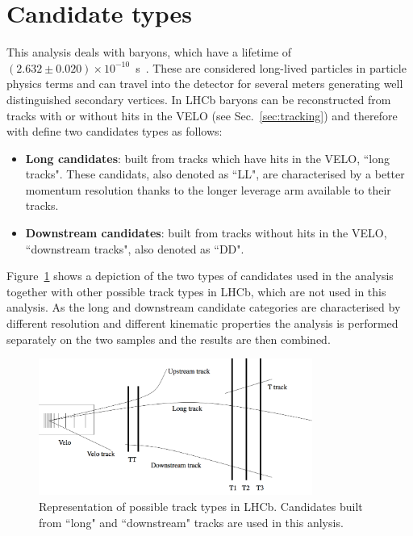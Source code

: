 \section{Candidate types}

This analysis deals with \Lz baryons, which have a lifetime of \mbox{$(2.632 \pm 0.020 ) \times 10^{-10}$ s~\cite{PDG2014}}.
These are considered long-lived particles in particle physics terms and can travel into the
detector for several meters generating well distinguished secondary vertices.
In LHCb \Lz baryons can be reconstructed from tracks with or without hits in the VELO (see Sec.~\ref{sec:tracking}) and
therefore with define two candidates types as follows:

\begin{itemize}
\item {\bf Long candidates}: built from tracks which have hits in the VELO, ``long tracks".
These candidats, also denoted as ``LL", are characterised by a better momentum resolution
thanks to the longer leverage arm available to their tracks.
\item {\bf Downstream candidates}: built from tracks without hits in the VELO, 
``downstream tracks", also denoted as ``DD".
\end{itemize}

Figure~\ref{fig:track_types} shows a depiction of the two types of candidates used in the analysis
together with other possible track types in LHCb, which are not used in this analysis.
As the long and downstream candidate categories are characterised by different resolution and different
kinematic properties the analysis is performed separately on the two samples and the results are then combined.

\begin{figure}[hbt]
\centering
\includegraphics[width=0.8\textwidth,trim=0cm 0cm 0cm 5mm,]{Lmumu/figs/track_types.png}
\caption{Representation of possible track types in LHCb. Candidates built from ``long" and 
``downstream" tracks are used in this anlysis.}
\label{fig:track_types}
\end{figure}
 
